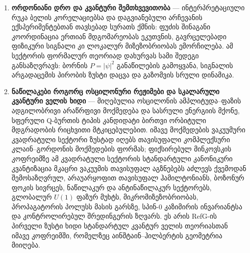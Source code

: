 \documentclass[11pt,a4paper]{article}
\begin{document}
\begin{enumerate}[label=\arabic*.]
კოსმოლოგიური სექტორის სრული მიკროფიზიკური ხიდი აერთიანებს $\rho_C(n_{C,{\rm op}})$-ის კვანძურ-ოსცილონურ წარმოშობას, მის კავშირს $n_{C,F}$-სა და $P_F$-თან, $\Omega_{C0}$-ის ნორმირებასა და მის კავშირს უკვე გამოყვანილ კოსმოლოგიურ–გალაქტიკურ თანაფარდობასთან $a_0^{\rm (RefG)} = \frac{3}{5\pi}c_0 H_0$, ადგილობრივი ატომური/QED ფარდობების ფუძისეულ წარმოშობას, კოფრეიმისა და ფაზის მიკროსკოპულ გაყოფას, ნაწილაკურ წყაროებს, კონკრეტულ არაერთგვაროვან ამონახსნებს, $\Lambda$-ს რიცხვით მნიშვნელობას, გენეზისთან შეწყვილებასა და მონაცემთა სრულ მოდელს.
\item \textbf{ორდონიანი დრო და კვანტური შემთხვევითობა} — ინტერპრეტაციული რუკა ბელის კორელაციებსა და დაგვიანებული არჩევანის ექსპერიმენტებთან თავსებად სურათს ქმნის: ფუძის შინაგანი კოორდინაცია ერთიან მდგომარეობას ეკუთვნის, გავრცელებადი ფიზიკური სიგნალი კი ლოკალურ მიზეზობრიობას ემორჩილება. ამ სექტორის ფორმალურ თეორიად დახურვას სამი შედეგი განსაზღვრავს: ბორნის $P=|\psi|^2$ განაწილების გამოყვანა, სიგნალის არგადაცემის პირობის ზუსტი დაცვა და გაზომვის სრული დინამიკა.
\item \textbf{ნაწილაკები როგორც ოსცილონური რეჟიმები და სკალარული კვანტური ველის ხიდი} — მიღებულია ოსცილონის ამპლიტუდა–ფაზის ადგილობრივი არაწრფივი მოქმედება და სასრული ენერგიის მქონე, სფერული Q-ბურთის ტიპის კანდიდატი ბირთვი ორბიტული მდგრადობის რიცხვითი მტკიცებულებით. იმავე მოქმედების ვაკუუმური კვადრატული სექტორი ზუსტად იღებს თავისუფალი კომპლექსური კლაინ–გორდონის მოქმედების ფორმას; ფიქსირებულ მინკოვსკის კოფრეიმზე ამ კვადრატული სექტორის სტანდარტული კანონიკური კვანტიზაცია მკაცრი ვაკუუმის თავისუფალ აგზნებებს აძლევს ქვემოდან შემოსაზღვრულ, არაუარყოფით თავისუფალ ჰამილტონიანს, ბოზონურ ფოკის სივრცეს, ნაწილაკურ და ანტინაწილაკურ სექტორებს, გლობალურ $U(1)$ ფაზურ მუხტს, მიკრომიზეზობრიობას, პროპაგატორის პოლუსს მასის გარსზე, სპინ-$0$ კაზიმირის ინვარიანტსა და კონტროლირებულ შრედინგერის ზღვარს. ეს არის RefG-ის პირველი ზუსტი ხიდი სტანდარტულ კვანტურ ველის თეორიასთან იმავე კოფრეიმში, რომელზეც აინშტაინ–ჰილბერტის გეომეტრია მიიღება.


\end{enumerate}
\end{document}
